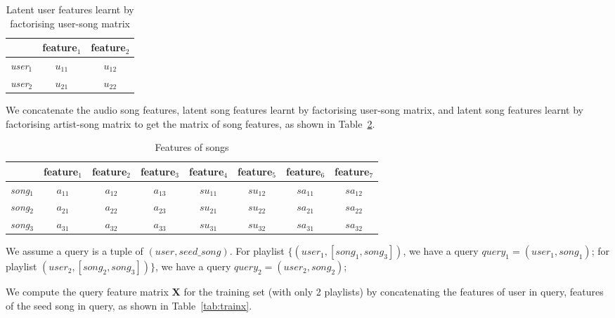 \begin{table}[h!]
\centering
\begin{tabular}{l|cc} \hline \hline 
& feature$_1$ & feature$_2$ \\ \hline
{\it user}$_1$ & $u_{11}$ & $u_{12}$ \\
{\it user}$_2$ & $u_{21}$ & $u_{22}$ \\ \hline
\end{tabular}
\caption{Latent user features learnt by factorising user-song matrix}
\label{tab:user-song}
\end{table}

We concatenate the audio song features, 
latent song features learnt by factorising user-song matrix,
and latent song features learnt by factorising artist-song matrix 
to get the matrix of song features, as shown in Table~\ref{tab:song}.

\begin{table}[h!]
\centering
\begin{tabular}{l|ccc|cc|cc} \hline \hline 
& feature$_1$ & feature$_2$ & feature$_3$ & feature$_4$ & feature$_5$ & feature$_6$ & feature$_7$ \\ \hline
{\it song}$_1$ & $a_{11}$ & $a_{12}$ & $a_{13}$ & $su_{11}$ & $su_{12}$ & $sa_{11}$ & $sa_{12}$ \\          
{\it song}$_2$ & $a_{21}$ & $a_{22}$ & $a_{23}$ & $su_{21}$ & $su_{22}$ & $sa_{21}$ & $sa_{22}$ \\          
{\it song}$_3$ & $a_{31}$ & $a_{32}$ & $a_{33}$ & $su_{31}$ & $su_{32}$ & $sa_{31}$ & $sa_{32}$ \\ \hline
\end{tabular}
\caption{Features of songs}
\label{tab:song}
\end{table}

We assume a query is a tuple of $(\textit{user}, \textit{seed\_song})$.
For playlist $\{(\textit{user}_1, [\textit{song}_1, \textit{song}_3])$,
we have a query $\textit{query}_1 = (\textit{user}_1, \textit{song}_1)$;
for playlist $(\textit{user}_2, [\textit{song}_2, \textit{song}_3])\}$,
we have a query $\textit{query}_2 = (\textit{user}_2, \textit{song}_2)$;

We compute the query feature matrix $\mathbf{X}$ for the training set (with only 2 playlists) 
by concatenating the features of user in query, features of the seed song in query, as shown in Table~\ref{tab:trainx}.

